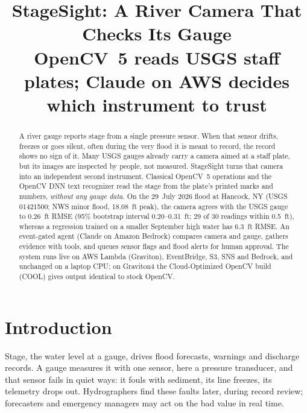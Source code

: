 \documentclass[conference,10pt,letterpaper]{IEEEtran}
\begin{document}
\title{StageSight: A River Camera That Checks Its Gauge\\
\large OpenCV~5 reads USGS staff plates; Claude on AWS decides which instrument to trust}
\author{
}
\maketitle

\begin{abstract}
A river gauge reports stage from a single pressure sensor. When that sensor drifts, freezes or
goes silent, often during the very flood it is meant to record, the record shows no sign of it.
Many USGS gauges already carry a camera aimed at a staff plate, but its images are inspected by
people, not measured. StageSight turns that camera into an independent second instrument.
Classical OpenCV~5 operations and the OpenCV DNN text recognizer read the stage from the plate's
printed marks and numbers, \emph{without any gauge data}. On the 29~July 2026 flood at Hancock,
NY (USGS 01421500; NWS minor flood, 18.08~ft peak), the camera agrees with the USGS gauge to
0.26~ft RMSE (95\% bootstrap interval 0.20--0.31~ft; 29 of 30 readings within 0.5~ft), whereas a
regression trained on a smaller September high water has 6.3~ft RMSE. An event-gated agent (Claude on Amazon
Bedrock) compares camera and gauge, gathers evidence with tools, and queues sensor flags and
flood alerts for human approval. \AgentAbstract{} The system runs live on AWS Lambda (Graviton), EventBridge, S3, SNS and
Bedrock, and unchanged on a laptop CPU; on Graviton4 the Cloud-Optimized OpenCV build (COOL)
gives output identical to stock OpenCV.
\end{abstract}

\section{Introduction}
Stage, the water level at a gauge, drives flood forecasts, warnings and discharge records. A
gauge measures it with one sensor, here a pressure transducer, and that sensor fails in quiet
ways: it fouls with sediment, its line freezes, its telemetry drops out. Hydrographers find
these faults later, during record review; forecasters and emergency managers may act on the bad
value in real time.
\end{document}
